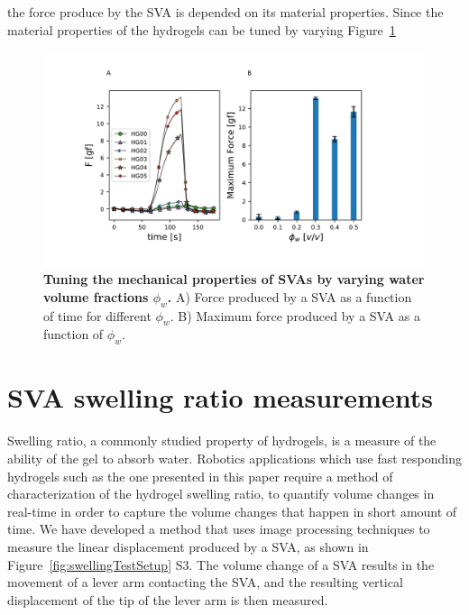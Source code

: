 the force produce by the SVA is depended on its material properties. Since the material properties of the hydrogels can be tuned by varying Figure~\ref{fig:svaForce}
\begin{figure}[!htb]
\centering
\includegraphics[width=\textwidth]{svaForce.pdf}
    \caption[Tuning the mechanical properties of SVAs]{\textbf{Tuning the mechanical properties of SVAs by varying water volume fractions $\phi_{w}$.} A) Force produced by a SVA as a function of time for different $\phi_{w}$. B) Maximum force produced by a SVA as a function of $\phi_{w}$. }
    \label{fig:svaForce}
\end{figure}

\section{SVA swelling ratio measurements}
Swelling ratio, a commonly studied property of hydrogels, is a measure of the ability of the gel to absorb water. Robotics applications which use fast responding hydrogels such as the one presented in this paper require a method of characterization of the hydrogel swelling ratio, to quantify volume changes in real-time in order to capture the volume changes that happen in short amount of time. We have developed a method that uses image processing techniques to measure the linear displacement produced by a SVA, as shown in Figure~\ref{fig:swellingTestSetup} S3. The volume change of a SVA results in the movement of a lever arm contacting the SVA, and the resulting vertical displacement of the tip of the lever arm is then measured. 

